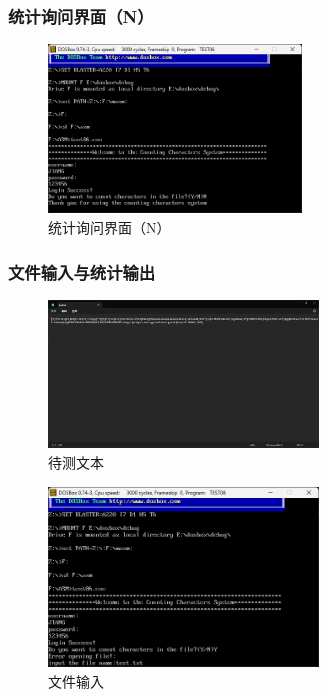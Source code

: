 \documentclass[UTF8,12pt]{article}
\begin{document}
\subsubsection{统计询问界面（N）}
\begin{figure}[htbp]
    \centering
    \includegraphics[width=0.60\textwidth]{img/5.png}
    \caption{统计询问界面（N）}
\end{figure}

\newpage

\subsubsection{文件输入与统计输出}
\begin{figure}[htbp]
    \centering
    \includegraphics[width=0.64\textwidth]{img/8.png}
    \caption{待测文本}
\end{figure}

\begin{figure}[htbp]
    \centering
    \includegraphics[width=0.64\textwidth]{img/6.png}
    \caption{文件输入}
\end{figure}
\end{document}
